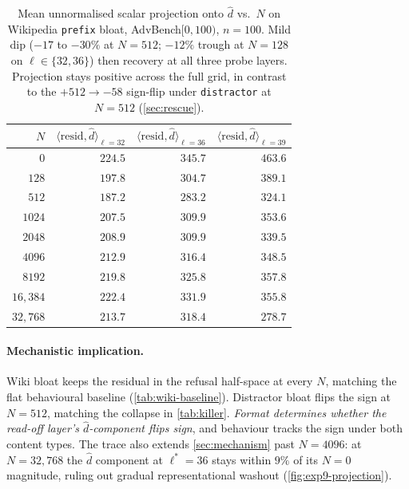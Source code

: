 \documentclass[10pt,twocolumn]{article}
\newcommand{\dhat}{\hat{d}}
\newcommand{\layerL}{\ell}
\newcommand{\Lread}{\layerL^{*}}
\newcommand{\Ncontext}{N}
\newcommand{\advbench}{AdvBench}
\theoremstyle{definition}
\begin{document}
\begin{table}[t]
\centering\small
\begin{tabular}{rrrr}
\toprule
$\Ncontext$ & $\langle \mathrm{resid}, \dhat \rangle_{\layerL{=}32}$
            & $\langle \mathrm{resid}, \dhat \rangle_{\layerL{=}36}$
            & $\langle \mathrm{resid}, \dhat \rangle_{\layerL{=}39}$ \\
\midrule
$0$        & $224.5$ & $345.7$ & $463.6$ \\
$128$      & $197.8$ & $304.7$ & $389.1$ \\
$512$      & $187.2$ & $283.2$ & $324.1$ \\
$1024$     & $207.5$ & $309.9$ & $353.6$ \\
$2048$     & $208.9$ & $309.9$ & $339.5$ \\
$4096$     & $212.9$ & $316.4$ & $348.5$ \\
$8192$     & $219.8$ & $325.8$ & $357.8$ \\
$16{,}384$ & $222.4$ & $331.9$ & $355.8$ \\
$32{,}768$ & $213.7$ & $318.4$ & $278.7$ \\
\bottomrule
\end{tabular}
\caption{Mean unnormalised scalar projection onto $\dhat$ vs.\
$\Ncontext$ on Wikipedia \texttt{prefix} bloat, \advbench{}$[0, 100)$,
$n{=}100$. Mild dip ($-17$ to $-30\%$ at $\Ncontext{=}512$; $-12\%$
trough at $\Ncontext{=}128$ on $\layerL{\in}\{32,36\}$) then recovery
at all three probe layers. Projection stays positive across the full
grid, in contrast to the $+512 \to -58$ sign-flip under \texttt{distractor}
at $\Ncontext{=}512$ (\cref{sec:rescue}).}
\label{tab:wiki-projection}
\end{table}

\paragraph{Mechanistic implication.} Wiki bloat keeps the residual in
the refusal half-space at every $\Ncontext$, matching the flat
behavioural baseline (\cref{tab:wiki-baseline}). Distractor bloat
flips the sign at $\Ncontext{=}512$, matching the collapse in
\cref{tab:killer}. \emph{Format determines whether the read-off
layer's $\dhat$-component flips sign}, and behaviour tracks the sign
under both content types. The trace also extends \cref{sec:mechanism}
past $\Ncontext{=}4096$: at $\Ncontext{=}32{,}768$ the $\dhat$
component at $\Lread{=}36$ stays within $9\%$ of its $\Ncontext{=}0$
magnitude, ruling out gradual representational washout
(\cref{fig:exp9-projection}).
\end{document}
